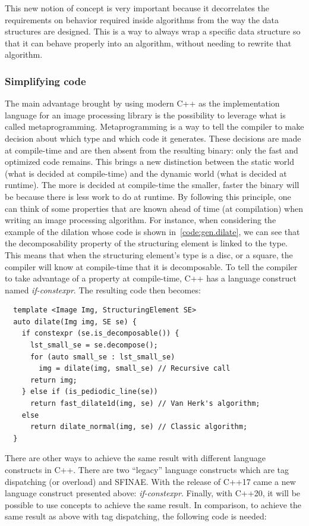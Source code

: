 This new notion of concept is very important because it decorrelates the requirements on behavior required inside
algorithms from the way the data structures are designed. This is a way to always wrap a specific data structure so that
it can behave properly into an algorithm, without needing to rewrite that algorithm.

\subsubsection{Simplifying code}
\label{subsec:simplifying}

The main advantage brought by using modern C++ as the implementation language for an image processing library is the
possibility to leverage what is called metaprogramming. Metaprogramming is a way to tell the compiler to make decision
about which type and which code it generates. These decisions are made at compile-time and are then absent from the
resulting binary: only the fast and optimized code remains. This brings a new distinction between the static world (what
is decided at compile-time) and the dynamic world (what is decided at runtime). The more is decided at compile-time the
smaller, faster the binary will be because there is less work to do at runtime. By following this principle, one can
think of some properties that are known ahead of time (at compilation) when writing an image processing algorithm. For
instance, when considering the example of the dilation whose code is shown in~\cref{code:gen.dilate}, we can see that
the decomposability property of the structuring element is linked to the type. This means that when the structuring
element's type is a disc, or a square, the compiler will know at compile-time that it is decomposable. To tell the
compiler to take advantage of a property at compile-time, C++ has a language construct named \emph{if-constexpr}. The
resulting code then becomes:

\begin{verbatim}
  template <Image Img, StructuringElement SE>
  auto dilate(Img img, SE se) {
    if constexpr (se.is_decomposable()) {
      lst_small_se = se.decompose();
      for (auto small_se : lst_small_se)
        img = dilate(img, small_se) // Recursive call
      return img;
    } else if (is_pediodic_line(se))
      return fast_dilate1d(img, se) // Van Herk's algorithm;
    else
      return dilate_normal(img, se) // Classic algorithm;
  }
\end{verbatim}

There are other ways to achieve the same result with different language constructs in C++. There are two ``legacy''
language constructs which are tag dispatching (or overload) and SFINAE. With the release of C++17 came a new language
construct presented above: \emph{if-constexpr}. Finally, with C++20, it will be possible to use concepts to achieve the
same result. In comparison, to achieve the same result as above with tag dispatching, the following code is needed:

